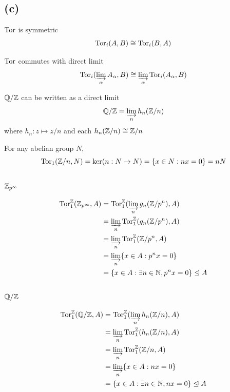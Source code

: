 \documentclass{article}
\begin{document}
\subsection{(c)}


\begin{lemma}
    $\operatorname{Tor}$ is symmetric
    $$
        \operatorname{Tor}_i (A, B) \cong \operatorname{Tor}_i (B, A)
    $$
\end{lemma}

\begin{lemma}
    $\operatorname{Tor}$ commutes with direct limit
    $$
        \operatorname{Tor}_i (\varinjlim_\alpha A_\alpha, B) \cong \varinjlim_\alpha \operatorname{Tor}_i (A_\alpha, B)
    $$
\end{lemma}

\begin{lemma}
    $\mathbb{Q} / \mathbb{Z}$ can be written as a direct limit
    $$
        \mathbb{Q} / \mathbb{Z} = \varinjlim_{n} h_n(\mathbb{Z} / n)
    $$
    where $h_n: z \mapsto z / n$ and each $h_n(\mathbb{Z} / n) \cong \mathbb{Z} / n$
\end{lemma}

\begin{lemma}
    For any abelian group $N$,
    $$
        \operatorname{Tor}_1(\mathbb{Z}/n, N) = \ker (n: N \to N) = \{x \in N: nx = 0\} = nN
    $$
\end{lemma}

\subsubsection{$\mathbb{Z}_{p^\infty}$}

\begin{align*}
    \operatorname{Tor}^{\mathbb{Z}}_1(\mathbb{Z}_{p^\infty}, A)
    &= \operatorname{Tor}^{\mathbb{Z}}_1(\varinjlim_n g_n(\mathbb{Z} / p^n), A) \\
    &= \varinjlim_n \operatorname{Tor}^{\mathbb{Z}}_1( g_n(\mathbb{Z} / p^n), A) \\
    &= \varinjlim_n \operatorname{Tor}^{\mathbb{Z}}_1(\mathbb{Z} / p^n, A) \\
    &= \varinjlim_n \{x \in A: p^n x = 0\} \\
    &= \{x \in A: \exists n \in \mathbb{N}, p^n x = 0\} \trianglelefteq A
\end{align*}

\subsubsection{$\mathbb{Q} / \mathbb{Z}$}

\begin{align*}
    \operatorname{Tor}^{\mathbb{Z}}_1(\mathbb{Q} / \mathbb{Z}, A)
    &= \operatorname{Tor}^{\mathbb{Z}}_1 (\varinjlim_{n} h_n(\mathbb{Z} / n), A) \\
    &= \varinjlim_{n} \operatorname{Tor}^{\mathbb{Z}}_1 ( h_n(\mathbb{Z} / n), A) \\
    &= \varinjlim_{n} \operatorname{Tor}^{\mathbb{Z}}_1 (\mathbb{Z} / n, A) \\
    &= \varinjlim_n \{x \in A: n x = 0\} \\
    &= \{x \in A: \exists n \in \mathbb{N}, n x = 0\} \trianglelefteq A
\end{align*}
\end{document}
